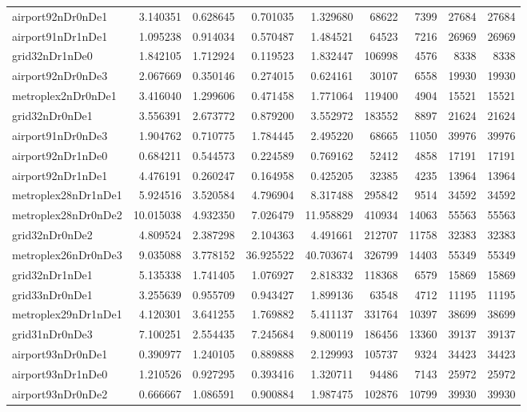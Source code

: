 \begin{longtable}{|l|r|r|r|r|r|r|r|r|}
airport92nDr0nDe1 & 3.140351 & 0.628645 & 0.701035 & 1.329680 & 68622 & 7399 & 27684 & 27684 \\
airport91nDr1nDe1 & 1.095238 & 0.914034 & 0.570487 & 1.484521 & 64523 & 7216 & 26969 & 26969 \\
grid32nDr1nDe0 & 1.842105 & 1.712924 & 0.119523 & 1.832447 & 106998 & 4576 & 8338 & 8338 \\
airport92nDr0nDe3 & 2.067669 & 0.350146 & 0.274015 & 0.624161 & 30107 & 6558 & 19930 & 19930 \\
metroplex2nDr0nDe1 & 3.416040 & 1.299606 & 0.471458 & 1.771064 & 119400 & 4904 & 15521 & 15521 \\
grid32nDr0nDe1 & 3.556391 & 2.673772 & 0.879200 & 3.552972 & 183552 & 8897 & 21624 & 21624 \\
airport91nDr0nDe3 & 1.904762 & 0.710775 & 1.784445 & 2.495220 & 68665 & 11050 & 39976 & 39976 \\
airport92nDr1nDe0 & 0.684211 & 0.544573 & 0.224589 & 0.769162 & 52412 & 4858 & 17191 & 17191 \\
airport92nDr1nDe1 & 4.476191 & 0.260247 & 0.164958 & 0.425205 & 32385 & 4235 & 13964 & 13964 \\
metroplex28nDr1nDe1 & 5.924516 & 3.520584 & 4.796904 & 8.317488 & 295842 & 9514 & 34592 & 34592 \\
metroplex28nDr0nDe2 & 10.015038 & 4.932350 & 7.026479 & 11.958829 & 410934 & 14063 & 55563 & 55563 \\
grid32nDr0nDe2 & 4.809524 & 2.387298 & 2.104363 & 4.491661 & 212707 & 11758 & 32383 & 32383 \\
metroplex26nDr0nDe3 & 9.035088 & 3.778152 & 36.925522 & 40.703674 & 326799 & 14403 & 55349 & 55349 \\
grid32nDr1nDe1 & 5.135338 & 1.741405 & 1.076927 & 2.818332 & 118368 & 6579 & 15869 & 15869 \\
grid33nDr0nDe1 & 3.255639 & 0.955709 & 0.943427 & 1.899136 & 63548 & 4712 & 11195 & 11195 \\
metroplex29nDr1nDe1 & 4.120301 & 3.641255 & 1.769882 & 5.411137 & 331764 & 10397 & 38699 & 38699 \\
grid31nDr0nDe3 & 7.100251 & 2.554435 & 7.245684 & 9.800119 & 186456 & 13360 & 39137 & 39137 \\
airport93nDr0nDe1 & 0.390977 & 1.240105 & 0.889888 & 2.129993 & 105737 & 9324 & 34423 & 34423 \\
airport93nDr1nDe0 & 1.210526 & 0.927295 & 0.393416 & 1.320711 & 94486 & 7143 & 25972 & 25972 \\
airport93nDr0nDe2 & 0.666667 & 1.086591 & 0.900884 & 1.987475 & 102876 & 10799 & 39930 & 39930 \\

\end{longtable}

